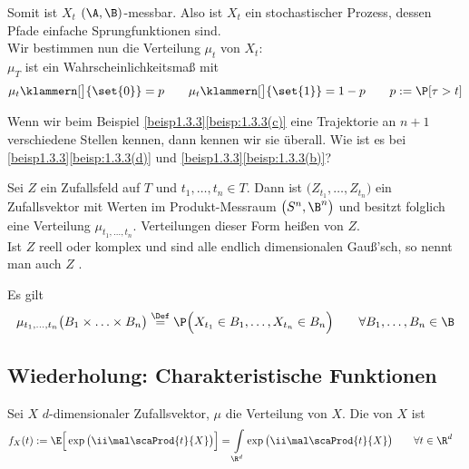 \begin{beispiel}
\begin{enumerate}[label=(\alph*)]
\begin{lösung}
			Somit ist $X_t$ $(\A,\B)$-messbar.
			Also ist $X_t$ ein stochastischer Prozess, dessen Pfade einfache Sprungfunktionen sind.\\
			Wir bestimmen nun die Verteilung $\mu_t$ von $X_t$:\\
			$\mu_T$ ist ein Wahrscheinlichkeitsmaß mit
			\begin{align*}
				\mu_t\klammern[\big]{\set{0}}=p\qquad
				\mu_t\klammern[\big]{\set{1}}=1-p\qquad
				p:=\P[\tau>t]
			\end{align*}
		\end{lösung}
	\end{enumerate}
\end{beispiel}

\begin{aufgabenr}\label{aufg:5}
	Wenn wir beim Beispiel \ref{beisp1.3.3}\ref{beisp:1.3.3(c)} eine Trajektorie an $n+1$ verschiedene Stellen kennen, dann kennen wir sie überall.
	Wie ist es bei \ref{beisp1.3.3}\ref{beisp:1.3.3(d)} und \ref{beisp1.3.3}\ref{beisp:1.3.3(b)}?
\end{aufgabenr}

\setcounter{satz}{4} %

\begin{definition}\label{def:1.3.5}
	Sei $Z$ ein Zufallsfeld auf $T$ und $t_1,\ldots,t_n\in T$.
	Dann ist $\big(Z_{t_1},\ldots,Z_{t_n}\big)$ ein Zufallsvektor mit Werten im Produkt-Messraum $\big(S^n,\B^n\big)$ und besitzt folglich eine Verteilung $\mu_{t_1,\ldots,t_n}$.
	Verteilungen dieser Form heißen  von $Z$. \\
	Ist $Z$ reell oder komplex und sind alle endlich dimensionalen Gauß'sch, so nennt man auch $Z$ .
\end{definition}

\begin{bemerkung}
	Es gilt
	\begin{align*}
		\mu_{t_1,\ldots,t_n}\big(B_1\times\ldots\times B_n\big)
		\overset{\Def}{=}
		\P\Big(X_{t_1}\in B_1,\ldots,X_{t_n}\in B_n\Big)\qquad\forall B_1,\ldots,B_n\in\B
	\end{align*}
\end{bemerkung}

\subsection*{Wiederholung: Charakteristische Funktionen}
\begin{defi}
	Sei $X$ $d$-dimensionaler Zufallsvektor, $\mu$ die Verteilung von $X$.
	Die  von $X$ ist
	\begin{align*}
		f_X(t)&:=\E\Big[\exp\big(\ii\mal\scaProd{t}{X}\big)\Big]
		=\int\limits_{\R^d}\exp\big(\ii\mal\scaProd{t}{X}\big)\qquad\forall t\in\R^d
	\end{align*}
\end{defi}

